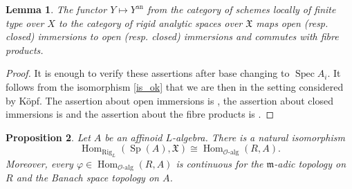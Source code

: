 \documentclass{amsart}
\newtheorem{prop}{Proposition}[section]
\newtheorem{lem}[prop]{Lemma}
\theoremstyle{definition}
\theoremstyle{remark}
\DeclareMathOperator{\Hom}{Hom}
\DeclareMathOperator{\Spec}{Spec}
\DeclareMathOperator{\Sp}{Sp}
\newcommand{\mm}{\mathfrak m}
\newcommand{\OO}{\mathcal O}
\newcommand{\ana}{\mathrm{an}}
\newcommand{\alg}{\mathrm{alg}}
\newcommand{\Rig}{\mathrm{Rig}}
\begin{document}
\begin{lem}\label{clofib} The functor $Y\mapsto Y^{\ana}$ from the category of  schemes locally of finite type 
over $X$ to the category of rigid analytic spaces over $\mathfrak X$ maps open (resp. closed) immersions to open (resp. closed) immersions and commutes with fibre products.
\end{lem}
\begin{proof} It is enough to verify these assertions after base changing to $\Spec A_i$. It follows from the isomorphism \eqref{is_ok} that we are then in the setting considered by K\"opf. The assertion about open immersions is \cite[Folgerung 1.3 2)]{Koepf}, the assertion 
about closed immersions is \cite[Hilfsatz 2.10]{Koepf} and the assertion about the
fibre products is \cite[Satz 1.8]{Koepf}.
\end{proof}






\begin{prop}\label{algebraic} Let $A$ be 
an affinoid $L$-algebra. There is a natural isomorphism 
$$\Hom_{\Rig_L}(\Sp(A), \mathfrak X)\cong \Hom_{\OO\text{-}\alg}(R, A).$$
Moreover, every $\varphi\in \Hom_{\OO\text{-}\alg}(R, A)$ is continuous
for the $\mm$-adic topology on $R$ and the Banach space topology on $A$.
\end{prop} 
\end{document}
